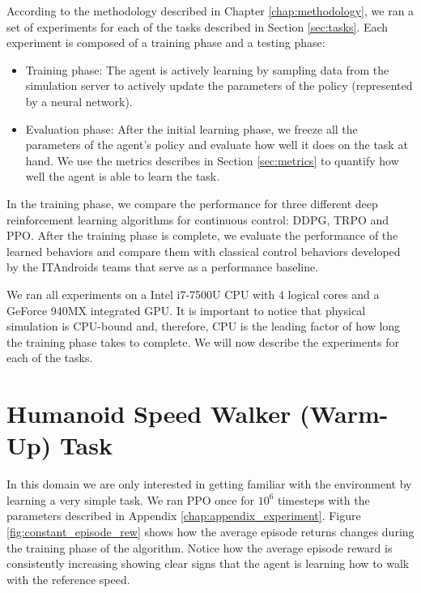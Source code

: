 According to the methodology described in Chapter \ref{chap:methodology}, we ran a set of experiments
for each of the tasks described in Section \ref{sec:tasks}.
Each experiment is composed of a training phase and a testing phase:

\begin{itemize}
	\item Training phase: The agent is actively learning by sampling data from the simulation server to 
	actively update the parameters of the policy (represented by a neural network).
	\item Evaluation phase: After the initial learning phase, we freeze all the parameters of the agent's 
	policy and evaluate how well it does on the task at hand. 
	We use the metrics describes in Section \ref{sec:metrics} to quantify how well the agent is able to learn the task.
\end{itemize}

In the training phase, we compare the performance for three different deep reinforcement learning algorithms for continuous
control: DDPG, TRPO and PPO.
After the training phase is complete, we evaluate the performance of the learned behaviors and compare them with
classical control behaviors developed by the ITAndroids teams that serve as a performance baseline.

We ran all experiments on a Intel i7-7500U CPU with $4$ logical cores and a GeForce 940MX integrated GPU.
It is important to notice that physical simulation is CPU-bound and, therefore, CPU is the leading
factor of how long the training phase takes to complete.
We will now describe the experiments for each of the tasks.

\section{Humanoid Speed Walker (Warm-Up) Task}

In this domain we are only interested in getting familiar with the environment by learning a very simple task.
We ran PPO once for $10^6$ timesteps with the parameters described in Appendix \ref{chap:appendix_experiment}.
Figure \ref{fig:constant_episode_rew} shows how the average episode returns changes during the training phase of
the algorithm.
Notice how the average episode reward is consistently increasing showing clear signs that the agent is learning how to walk
with the reference speed.

